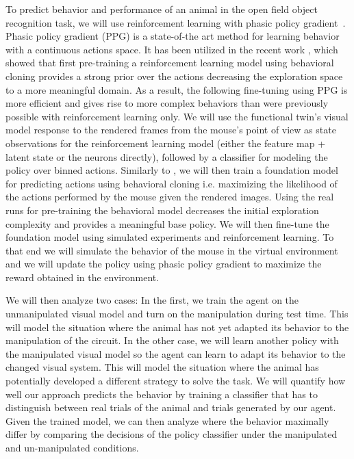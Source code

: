 \documentclass[B2,COG]{ercgrant}
\begin{document}
To predict behavior and performance of an animal in the open field object recognition task, we will use reinforcement learning with phasic policy gradient~\parencite[PPG,][]{Cobbe2021-op}. 
Phasic policy gradient (PPG) is a state-of-the art method for learning behavior with a continuous actions space. 
It has been utilized in the recent work \cite{Baker2022-ph}, which showed that first pre-training a reinforcement learning model using behavioral cloning provides a strong prior over the actions decreasing the exploration space to a more meaningful domain. 
As a result, the following fine-tuning using PPG is more efficient and gives rise to more complex behaviors than were previously possible with reinforcement learning only.
We will use the functional twin's visual model response to the rendered frames from the mouse's point of view as state observations for the reinforcement learning model (either the feature map + latent state or the neurons directly), followed by a classifier for modeling the policy over binned actions.
Similarly to \cite{Baker2022-ph}, we will then train a foundation model for predicting actions using behavioral cloning i.e. maximizing the likelihood of the actions performed by the mouse given the rendered images.
Using the real runs for pre-training the behavioral model decreases the initial exploration complexity and provides a meaningful base policy.
We will then fine-tune the foundation model using simulated experiments and reinforcement learning. 
To that end we will simulate the behavior of the mouse in the virtual environment and we will update the policy using phasic policy gradient \parencite{Cobbe2021-op} to maximize the reward obtained in the environment.

We will then analyze two cases: In the first, we train the agent on the unmanipulated visual model and turn on the manipulation during test time. 
This will model the situation where the animal has not yet adapted its behavior to the manipulation of the circuit. 
In the other case, we will learn another policy with the manipulated visual model so the agent can learn to adapt its behavior to the changed visual system. 
This will model the situation where the animal has potentially developed a different strategy to solve the task. 
We will quantify how well our approach predicts the behavior by training a classifier that has to distinguish between real trials of the animal and trials generated by our agent. 
Given the trained model, we can then analyze where the behavior maximally differ by comparing the decisions of the policy classifier under the manipulated and un-manipulated conditions. 
\end{document}
